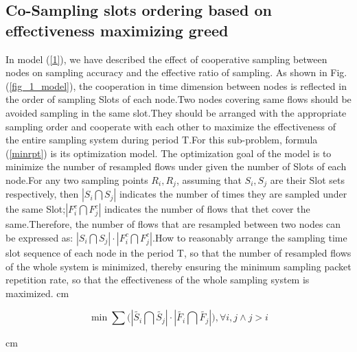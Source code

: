 \documentclass[conference]{IEEEtran}
\begin{document}
\subsection{Co-Sampling slots ordering based on effectiveness maximizing greed}
In model (\ref{1}), we have described the effect of cooperative sampling between nodes on sampling accuracy and the effective ratio of sampling. As shown in Fig.(\ref{fig_1_model}), the cooperation in time dimension between nodes is reflected in the order of sampling Slots of each node.Two nodes covering same flows should be avoided sampling in the same slot.They should be arranged with the appropriate sampling order and cooperate with each other to maximize the effectiveness of the entire sampling system during period T.For this sub-problem, formula (\ref{minrpt}) is its optimization model. The optimization goal of the model is to minimize the number of resampled flows under given the number of Slots of each node.For any two sampling points $R_i, R_j$, assuming that $S_i, S_j$ are their Slot sets respectively, then $|S_i \bigcap S_j|$ indicates the number of times they are sampled under the same Slot;$|F_i^c \bigcap F_j^c|$ indicates the number of flows that thet cover the same.Therefore, the number of flows that are resampled between two nodes can be expressed as: $|S_i \bigcap S_j| \cdot |F_i^c \bigcap F_j^c|$.How to reasonably arrange the sampling time slot sequence of each node in the period T, so that the number of resampled flows of the whole system is minimized, thereby ensuring the minimum sampling packet repetition rate, so that the effectiveness of the whole sampling system is maximized.
 cm
\begin{spacing}{0.5}
\begin{small}
\begin{equation}
\min \sum{(\left| \widetilde{{{S}_{i}}}\bigcap \widetilde{{{S}_{j}}} \right|}\cdot \left| \widetilde{{{F}_{i}}}\bigcap \widetilde{{{F}_{j}}} \right|),\forall i,j\wedge j>i
\label{minrpt}
\end{equation}
\end{small}
\end{spacing}
 cm
\end{document}

